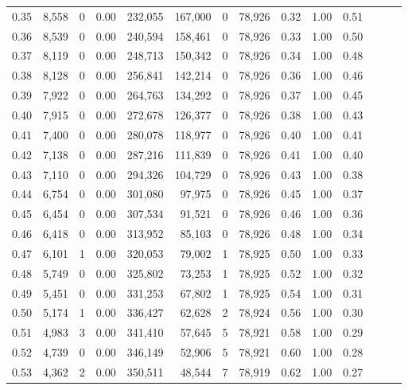 \begin{tabular}{rrrrrrrrrrrrrr}
0.35 &  8,558 &      0 &  0.00 &  232,055 &  167,000 &       0 &  78,926 &  0.32 &  1.00 &      0.51 \\
0.36 &  8,539 &      0 &  0.00 &  240,594 &  158,461 &       0 &  78,926 &  0.33 &  1.00 &      0.50 \\
0.37 &  8,119 &      0 &  0.00 &  248,713 &  150,342 &       0 &  78,926 &  0.34 &  1.00 &      0.48 \\
0.38 &  8,128 &      0 &  0.00 &  256,841 &  142,214 &       0 &  78,926 &  0.36 &  1.00 &      0.46 \\
0.39 &  7,922 &      0 &  0.00 &  264,763 &  134,292 &       0 &  78,926 &  0.37 &  1.00 &      0.45 \\
0.40 &  7,915 &      0 &  0.00 &  272,678 &  126,377 &       0 &  78,926 &  0.38 &  1.00 &      0.43 \\
0.41 &  7,400 &      0 &  0.00 &  280,078 &  118,977 &       0 &  78,926 &  0.40 &  1.00 &      0.41 \\
0.42 &  7,138 &      0 &  0.00 &  287,216 &  111,839 &       0 &  78,926 &  0.41 &  1.00 &      0.40 \\
0.43 &  7,110 &      0 &  0.00 &  294,326 &  104,729 &       0 &  78,926 &  0.43 &  1.00 &      0.38 \\
0.44 &  6,754 &      0 &  0.00 &  301,080 &   97,975 &       0 &  78,926 &  0.45 &  1.00 &      0.37 \\
0.45 &  6,454 &      0 &  0.00 &  307,534 &   91,521 &       0 &  78,926 &  0.46 &  1.00 &      0.36 \\
0.46 &  6,418 &      0 &  0.00 &  313,952 &   85,103 &       0 &  78,926 &  0.48 &  1.00 &      0.34 \\
0.47 &  6,101 &      1 &  0.00 &  320,053 &   79,002 &       1 &  78,925 &  0.50 &  1.00 &      0.33 \\
0.48 &  5,749 &      0 &  0.00 &  325,802 &   73,253 &       1 &  78,925 &  0.52 &  1.00 &      0.32 \\
0.49 &  5,451 &      0 &  0.00 &  331,253 &   67,802 &       1 &  78,925 &  0.54 &  1.00 &      0.31 \\
0.50 &  5,174 &      1 &  0.00 &  336,427 &   62,628 &       2 &  78,924 &  0.56 &  1.00 &      0.30 \\
0.51 &  4,983 &      3 &  0.00 &  341,410 &   57,645 &       5 &  78,921 &  0.58 &  1.00 &      0.29 \\
0.52 &  4,739 &      0 &  0.00 &  346,149 &   52,906 &       5 &  78,921 &  0.60 &  1.00 &      0.28 \\
0.53 &  4,362 &      2 &  0.00 &  350,511 &   48,544 &       7 &  78,919 &  0.62 &  1.00 &      0.27 \\

\end{tabular}
